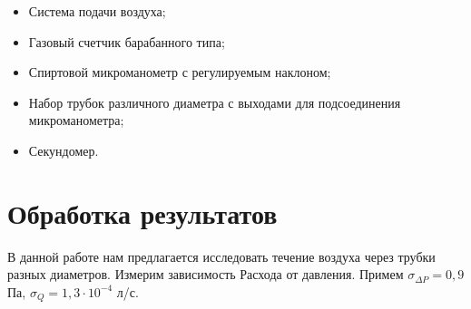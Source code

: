 \documentclass[12pt]{article}
\begin{document}
\begin{itemize}
	\item Система подачи воздуха;
	\item Газовый счетчик барабанного типа;
	\item Спиртовой микроманометр с регулируемым наклоном;
	\item Набор трубок различного диаметра с выходами для подсоединения микроманометра;
	\item Секундомер.
\end{itemize}

\section{Обработка результатов}

В данной работе нам предлагается исследовать течение воздуха через трубки разных диаметров. Измерим зависимость Расхода от давления. Примем $\sigma_{\Delta P} = 0,9$ Па, $\sigma_Q = 1,3\cdot10^{-4}$ л/с.
\end{document}
